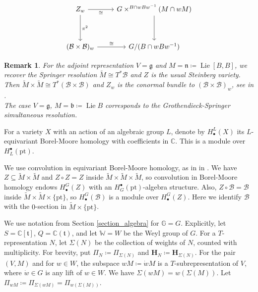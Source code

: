 \documentclass[11pt]{article}
\newcommand{\C}{\mathbb{C}}
\newcommand{\B}{\mathcal{B}}
\renewcommand{\H}{\textbf{H}}
\newcommand{\g}{\mathfrak{g}}
\renewcommand{\t}{\mathfrak{t}}
\newcommand{\1}{\mathbb{1}}
\newcommand{\HBM}[2]{H_\bullet^{#1}(#2)}
\newcommand{\tM}{\widetilde{M}}
\newcommand{\pt}{\text{pt}}
\renewcommand{\subset}{\subseteq}
\newtheorem{remark}[theorem]{Remark}
\theoremstyle{definition}
\numberwithin{equation}{section}
\begin{document}
\begin{equation}
\label{finite_Zw_as_bundle}
\begin{tikzcd}
	Z_w & G \times^{B \cap wB w^{-1}} (M \cap wM)\\
    \\
    (\B\times\B)_w & G/(B\cap w B w^{-1})
	\arrow["\cong"', from=1-1, to=1-2]
	\arrow["\pi^2", from=1-1, to=3-1]
	\arrow[""', from=1-2, to=3-2]
	\arrow["\cong", from=3-1, to=3-2]
\end{tikzcd}  
\end{equation}


\begin{remark}
    For the adjoint representation $V=\g$ and $M = \mathfrak{n} \coloneqq \operatorname{Lie} [B,B]$, we recover the Springer resolution $\tM \cong T^* \B$ and $Z$ is the usual Steinberg variety. Then $\tM \times \tM \cong T^*(\B\times \B)$ and $Z_w$ is the conormal bundle to $(\B \times \B)_w$, see  in \cite{CG}.\\
    The case $V=\g$, $M=\mathfrak{b}\coloneqq \operatorname{Lie} B$ corresponds to the Grothendieck-Springer simultaneous resolution.
\end{remark}

For a variety $X$ with an action of an algebraic group $L$, denote by $\HBM{L}{X}$ its $L$-equivariant Borel-Moore homology with coefficients in $\C$. This is a module over $H^\bullet_L(\pt)$.

We use convolution in equivariant Borel-Moore homology, as in  in \cite{CG}.  We have $Z\subset \tM \times \tM$ and $Z\circ Z = Z$ inside $\tM \times \tM \times \tM$, so convolution in Borel-Moore homology endows $\HBM{G}{Z}$ with an $H_G^\bullet(\pt)$-algebra structure. Also, $Z \circ \B = \B$ inside $\tM \times \tM \times \{\pt\}$, so $\HBM{G}{\B}$ is a module over $\HBM{G}{Z}$. Here we identify $\B$ with the $0$-section in $\tM\times\{ \pt\}$.

We use notation from Section \ref{section_algebra} for $\mathbb{G}=G$. Explicitly, let $S = \C[\t]$, $Q=\C(\t)$, and let $\mathbb{W}=W$ be the Weyl group of $G$. For a $T$-representation $N$, let $\Sigma(N)$ be the collection of weights of $N$, counted with multiplicity. For brevity, put  $\Pi_{N} \coloneqq \Pi_{\Sigma(N)}$ and $\H_N \coloneqq \H_{\Sigma(N)}$. For the pair $(V,M)$ and for $w\in W$, the subspace $wM\coloneqq \dot{w} M$ is a $T$-subrepresentation of $V$, where $\dot{w} \in G$ is any lift of $w\in W$. We have $\Sigma(wM) = w(\Sigma(M))$. Let $\Pi_{wM}\coloneqq  \Pi_{\Sigma(wM)}= \Pi_{w(\Sigma(M))}$.
\end{document}
